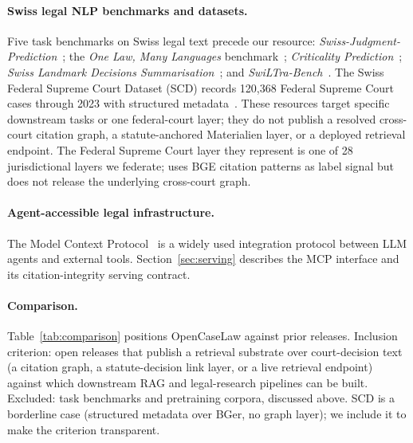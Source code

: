 \documentclass[11pt,a4paper]{article}
\begin{document}
\paragraph{Swiss legal NLP benchmarks and datasets.} Five task benchmarks on Swiss legal text precede our resource: \emph{Swiss-Judgment-Prediction}~\cite{niklaus2021}; the \emph{One Law, Many Languages} benchmark~\cite{stern2024}; \emph{Criticality Prediction}~\citep{stern2025criticality}; \emph{Swiss Landmark Decisions Summarisation}~\cite{rolshoven2025}; and \emph{SwiLTra-Bench}~\cite{niklaus2025swiltra}. The Swiss Federal Supreme Court Dataset (SCD) records 120{,}368 Federal Supreme Court cases through 2023 with structured metadata~\citep{geering2024scd}. These resources target specific downstream tasks or one federal-court layer; they do not publish a resolved cross-court citation graph, a statute-anchored Materialien layer, or a deployed retrieval endpoint. The Federal Supreme Court layer they represent is one of 28 jurisdictional layers we federate; \citet{stern2025criticality} uses BGE citation patterns as label signal but does not release the underlying cross-court graph.

\paragraph{Agent-accessible legal infrastructure.} The Model Context Protocol~\citep{mcpspec2025,mcpsurvey2025} is a widely used integration protocol between LLM agents and external tools. Section~\ref{sec:serving} describes the MCP interface and its citation-integrity serving contract.

\paragraph{Comparison.} Table~\ref{tab:comparison} positions OpenCaseLaw against prior releases. Inclusion criterion: open releases that publish a retrieval substrate over court-decision text (a citation graph, a statute-decision link layer, or a live retrieval endpoint) against which downstream RAG and legal-research pipelines can be built. Excluded: task benchmarks and pretraining corpora, discussed above. SCD is a borderline case (structured metadata over BGer, no graph layer); we include it to make the criterion transparent.
\end{document}
